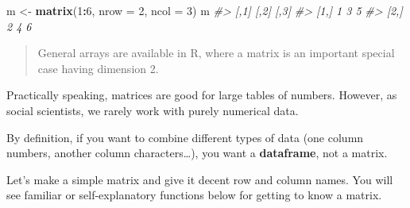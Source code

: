 \documentclass[]{book}
\newenvironment{Shaded}{\begin{snugshade}}{\end{snugshade}}
\newcommand{\KeywordTok}[1]{\textcolor[rgb]{0.13,0.29,0.53}{\textbf{#1}}}
\newcommand{\DataTypeTok}[1]{\textcolor[rgb]{0.13,0.29,0.53}{#1}}
\newcommand{\DecValTok}[1]{\textcolor[rgb]{0.00,0.00,0.81}{#1}}
\newcommand{\StringTok}[1]{\textcolor[rgb]{0.31,0.60,0.02}{#1}}
\newcommand{\CommentTok}[1]{\textcolor[rgb]{0.56,0.35,0.01}{\textit{#1}}}
\newcommand{\OperatorTok}[1]{\textcolor[rgb]{0.81,0.36,0.00}{\textbf{#1}}}
\newcommand{\NormalTok}[1]{#1}
\begin{document}
\begin{Shaded}
\begin{Highlighting}[]
\NormalTok{m <-}\StringTok{ }\KeywordTok{matrix}\NormalTok{(}\DecValTok{1}\OperatorTok{:}\DecValTok{6}\NormalTok{, }\DataTypeTok{nrow =} \DecValTok{2}\NormalTok{, }\DataTypeTok{ncol =} \DecValTok{3}\NormalTok{)}
\NormalTok{m}
\CommentTok{#>      [,1] [,2] [,3]}
\CommentTok{#> [1,]    1    3    5}
\CommentTok{#> [2,]    2    4    6}
\end{Highlighting}
\end{Shaded}

\begin{quote}
General arrays are available in R, where a matrix is an important
special case having dimension 2.
\end{quote}

Practically speaking, matrices are good for large tables of numbers.
However, as social scientists, we rarely work with purely numerical
data.

By definition, if you want to combine different types of data (one
column numbers, another column characters\ldots{}), you want a
\textbf{dataframe}, not a matrix.

Let's make a simple matrix and give it decent row and column names. You
will see familiar or self-explanatory functions below for getting to
know a matrix.
\end{document}
